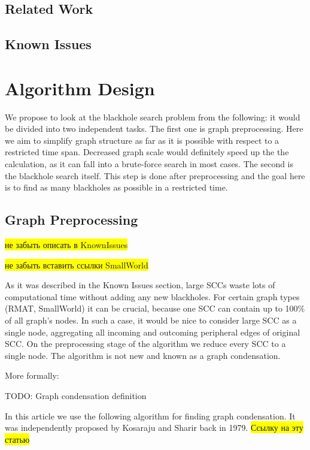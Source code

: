 \documentclass{svproc}
\newcommand{\FIXME}[1]{ %
	\colorbox{yellow}{#1}
}
\newcommand{\FIXME}[1]{ %
}
\begin{document}
%
\subsection{Related Work}
\cite{li2010detecting,li2012mining,li2014mining,hong2015detecting}

%
\subsection{Known Issues}
%

%
\section{Algorithm Design}
We propose to look at the blackhole search problem from the following: it would be divided into two independent tasks. 
The first one is graph preprocessing. Here we aim to simplify graph structure as far as it is possible with respect to a restricted time span. 
Decreased graph scale would definitely speed up the the calculation, as it can fall into a brute-force search in most cases.
The second is the blackhole search itself. This step is done after preprocessing and the goal here is to find as many blackholes as possible in a restricted time.
%

%
\subsection{Graph Preprocessing}
\FIXME{не забыть описать в KnownIssues}

\FIXME{не забыть вставить ссылки SmallWorld \cite{watts1999networks}}

As it was described in the Known Issues section, large SCCs waste lots of computational time without adding any new blackholes. 
For certain graph types (RMAT, SmallWorld) it can be crucial, because one SCC can contain up to 100\% of all graph's nodes. 
In such a case, it would be nice to consider large SCC as a single node, aggregating all incoming and outcoming peripheral edges
of original SCC.
On the preprocessing stage of the algorithm we reduce every SCC to a single node. The algorithm is not new and known as a graph condensation.

More formally:\par
\begin{definition}
TODO: Graph condensation definition
\end{definition}

In this article we use the following algorithm for finding graph condensation.
It was independently proposed by Kosaraju and Sharir back in 1979. \FIXME{Ссылку на эту статью} \par
\end{document}
